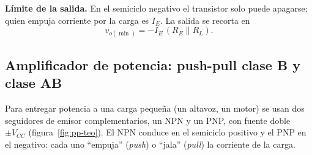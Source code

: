 \documentclass[11pt,a4paper]{article}
\newcommand{\pll}{\mathbin{\|}}
\begin{document}
\noindent\textbf{Límite de la salida.} En el semiciclo negativo el transistor solo puede
apagarse; quien empuja corriente por la carga es $I_E$. La salida se recorta en
\begin{equation}
  v_{o(\min)} = -I_E\,(R_E \pll R_L).
  \label{eq:recorte}
\end{equation}

\subsection{Amplificador de potencia: push-pull clase B y clase AB}
Para entregar potencia a una carga pequeña (un altavoz, un motor) se usan dos seguidores de
emisor complementarios, un NPN y un PNP, con fuente doble $\pm V_{CC}$
(figura~\ref{fig:pp-teo}). El NPN conduce en el semiciclo positivo y el PNP en el negativo:
cada uno ``empuja'' (\emph{push}) o ``jala'' (\emph{pull}) la corriente de la carga.
\end{document}
